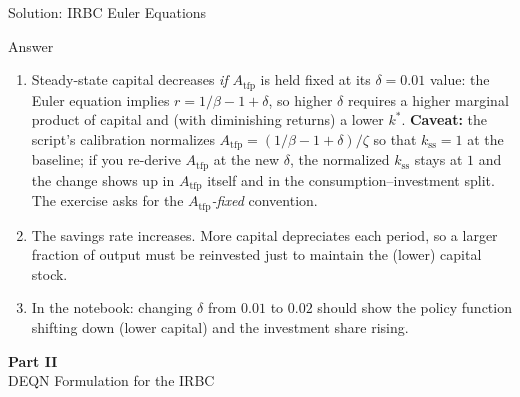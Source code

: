 \documentclass[aspectratio=169,11pt]{beamer}
\newcommand{\emphc}[1]{\textcolor{harvardcrimson}{#1}}
\begin{document}
\begin{frame}{Solution: IRBC Euler Equations}
\begin{block}{Answer}
\begin{enumerate}
    \item Steady-state capital \emphc{decreases} \emph{if} $A_\mathrm{tfp}$ is held fixed at its $\delta = 0.01$ value: the Euler equation implies $r = 1/\beta - 1 + \delta$, so higher $\delta$ requires a higher marginal product of capital and (with diminishing returns) a lower $k^*$.  \textbf{Caveat:} the script's calibration normalizes $A_\mathrm{tfp} = (1/\beta - 1 + \delta)/\zeta$ so that $k_\mathrm{ss} = 1$ at the baseline; if you re-derive $A_\mathrm{tfp}$ at the new $\delta$, the normalized $k_\mathrm{ss}$ stays at $1$ and the change shows up in $A_\mathrm{tfp}$ itself and in the consumption--investment split.  The exercise asks for the \emph{$A_\mathrm{tfp}$-fixed} convention.
    \item The savings rate \emphc{increases}. More capital depreciates each period, so a larger fraction of output must be reinvested just to maintain the (lower) capital stock.
    \item In the notebook: changing $\delta$ from $0.01$ to $0.02$ should show the policy function shifting down (lower capital) and the investment share rising.
\end{enumerate}
\end{block}
\end{frame}


\begin{frame}{}
\vfill
\begin{center}
{\Huge \textcolor{uzhblue}{\textbf{Part II}}}\\[12pt]
{\LARGE DEQN Formulation for the IRBC}
\end{center}
\vfill
\end{frame}
\end{document}
